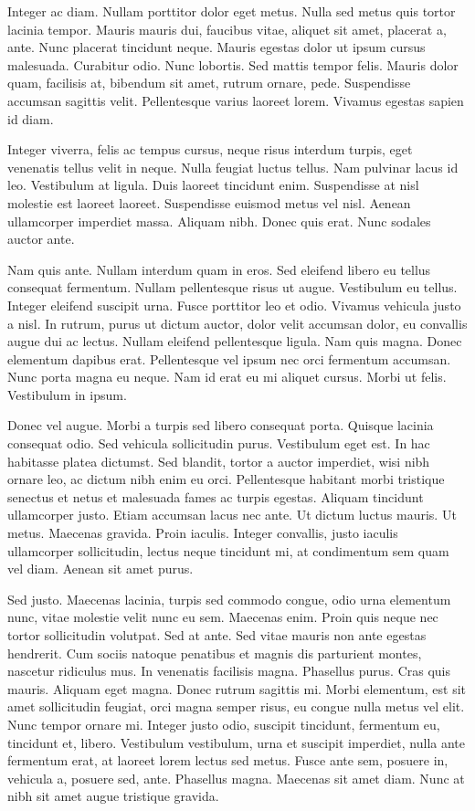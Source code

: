\documentclass{article}
\begin{document}
Integer ac diam. Nullam porttitor dolor eget metus. Nulla sed metus quis
tortor lacinia tempor. Mauris mauris dui, faucibus vitae, aliquet sit amet,
placerat a, ante. Nunc placerat tincidunt neque. Mauris egestas dolor ut ipsum
cursus malesuada. Curabitur odio. Nunc lobortis. Sed mattis tempor felis.
Mauris dolor quam, facilisis at, bibendum sit amet, rutrum ornare, pede.
Suspendisse accumsan sagittis velit. Pellentesque varius laoreet lorem. Vivamus
egestas sapien id diam.

Integer viverra, felis ac tempus cursus, neque risus interdum turpis, eget
venenatis tellus velit in neque. Nulla feugiat luctus tellus. Nam pulvinar
lacus id leo. Vestibulum at ligula. Duis laoreet tincidunt enim. Suspendisse at
nisl molestie est laoreet laoreet. Suspendisse euismod metus vel nisl. Aenean
ullamcorper imperdiet massa. Aliquam nibh. Donec quis erat. Nunc sodales auctor
ante.

Nam quis ante. Nullam interdum quam in eros. Sed eleifend libero eu tellus
consequat fermentum. Nullam pellentesque risus ut augue. Vestibulum eu tellus.
Integer eleifend suscipit urna. Fusce porttitor leo et odio. Vivamus vehicula
justo a nisl. In rutrum, purus ut dictum auctor, dolor velit accumsan dolor, eu
convallis augue dui ac lectus. Nullam eleifend pellentesque ligula. Nam quis
magna. Donec elementum dapibus erat. Pellentesque vel ipsum nec orci fermentum
accumsan. Nunc porta magna eu neque. Nam id erat eu mi aliquet cursus. Morbi ut
felis. Vestibulum in ipsum.

Donec vel augue. Morbi a turpis sed libero consequat porta. Quisque lacinia
consequat odio. Sed vehicula sollicitudin purus. Vestibulum eget est. In hac
habitasse platea dictumst. Sed blandit, tortor a auctor imperdiet, wisi nibh
ornare leo, ac dictum nibh enim eu orci. Pellentesque habitant morbi tristique
senectus et netus et malesuada fames ac turpis egestas. Aliquam tincidunt
ullamcorper justo. Etiam accumsan lacus nec ante. Ut dictum luctus mauris. Ut
metus. Maecenas gravida. Proin iaculis. Integer convallis, justo iaculis
ullamcorper sollicitudin, lectus neque tincidunt mi, at condimentum sem quam
vel diam. Aenean sit amet purus.

Sed justo. Maecenas lacinia, turpis sed commodo congue, odio urna elementum
nunc, vitae molestie velit nunc eu sem. Maecenas enim. Proin quis neque nec
tortor sollicitudin volutpat. Sed at ante. Sed vitae mauris non ante egestas
hendrerit. Cum sociis natoque penatibus et magnis dis parturient montes,
nascetur ridiculus mus. In venenatis facilisis magna. Phasellus purus. Cras
quis mauris. Aliquam eget magna. Donec rutrum sagittis mi. Morbi elementum, est
sit amet sollicitudin feugiat, orci magna semper risus, eu congue nulla metus
vel elit. Nunc tempor ornare mi. Integer justo odio, suscipit tincidunt,
fermentum eu, tincidunt et, libero. Vestibulum vestibulum, urna et suscipit
imperdiet, nulla ante fermentum erat, at laoreet lorem lectus sed metus. Fusce
ante sem, posuere in, vehicula a, posuere sed, ante. Phasellus magna. Maecenas
sit amet diam. Nunc at nibh sit amet augue tristique gravida.
\end{document}
